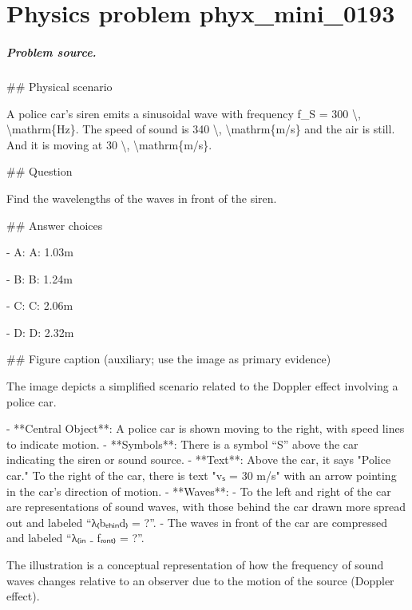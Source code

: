 
\chapter{Physics problem phyx\_mini\_0193}
\label{ch:PhyXMiniProblems_problem_phyx_mini_0193}

\paragraph{Problem source.}
\#\# Physical scenario

A police car's siren emits a sinusoidal wave with frequency f\_S = 300 \textbackslash{}, \textbackslash{}mathrm\{Hz\}. The speed of sound is 340 \textbackslash{}, \textbackslash{}mathrm\{m/s\} and the air is still. And it is moving at 30 \textbackslash{}, \textbackslash{}mathrm\{m/s\}.

\#\# Question

Find the wavelengths of the waves in front of the siren.

\#\# Answer choices

- A: A: 1.03m

- B: B: 1.24m

- C: C: 2.06m

- D: D: 2.32m

\#\# Figure caption (auxiliary; use the image as primary evidence)

The image depicts a simplified scenario related to the Doppler effect involving a police car. 

- **Central Object**: A police car is shown moving to the right, with speed lines to indicate motion.
- **Symbols**: There is a symbol “S” above the car indicating the siren or sound source.
- **Text**: Above the car, it says "Police car." To the right of the car, there is text "vₛ = 30 m/s" with an arrow pointing in the car's direction of motion.
- **Waves**: 
  - To the left and right of the car are representations of sound waves, with those behind the car drawn more spread out and labeled “λ₍bₑₕᵢₙd₎ = ?”.
  - The waves in front of the car are compressed and labeled “λ₍ᵢₙ ₋ fᵣₒₙₜ₎ = ?”.

The illustration is a conceptual representation of how the frequency of sound waves changes relative to an observer due to the motion of the source (Doppler effect).

